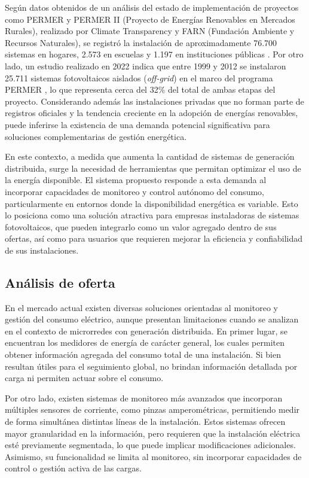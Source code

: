 Según datos obtenidos de un análisis del estado de implementación de proyectos como PERMER y PERMER II (Proyecto de Energías Renovables en Mercados Rurales), realizado por Climate Transparency y FARN (Fundación Ambiente y Recursos Naturales), se registró la instalación de aproximadamente 76.700 sistemas en hogares, 2.573 en escuelas y 1.197 en instituciones públicas \cite{farn2025_energias_renovables}. Por otro lado, un estudio realizado en 2022 indica que entre 1999 y 2012 se instalaron 25.711 sistemas fotovoltaicos aislados (\textit{off-grid}) en el marco del programa PERMER \cite{analyst2025_renewable_energy_in_argentina}, lo que representa cerca del 32\% del total de ambas etapas del proyecto. Considerando además las instalaciones privadas que no forman parte de registros oficiales y la tendencia creciente en la adopción de energías renovables, puede inferirse la existencia de una demanda potencial significativa para soluciones complementarias de gestión energética.

En este contexto, a medida que aumenta la cantidad de sistemas de generación distribuida, surge la necesidad de herramientas que permitan optimizar el uso de la energía disponible. El sistema propuesto responde a esta demanda al incorporar capacidades de monitoreo y control autónomo del consumo, particularmente en entornos donde la disponibilidad energética es variable. Esto lo posiciona como una solución atractiva para empresas instaladoras de sistemas fotovoltaicos, que pueden integrarlo como un valor agregado dentro de sus ofertas, así como para usuarios que requieren mejorar la eficiencia y confiabilidad de sus instalaciones.

\subsection{Análisis de oferta}
En el mercado actual existen diversas soluciones orientadas al monitoreo y gestión del consumo eléctrico, aunque presentan limitaciones cuando se analizan en el contexto de microrredes con generación distribuida. En primer lugar, se encuentran los medidores de energía de carácter general, los cuales permiten obtener información agregada del consumo total de una instalación. Si bien resultan útiles para el seguimiento global, no brindan información detallada por carga ni permiten actuar sobre el consumo.

Por otro lado, existen sistemas de monitoreo más avanzados que incorporan múltiples sensores de corriente, como pinzas amperométricas, permitiendo medir de forma simultánea distintas líneas de la instalación. Estos sistemas ofrecen mayor granularidad en la información, pero requieren que la instalación eléctrica esté previamente segmentada, lo que puede implicar modificaciones adicionales. Asimismo, su funcionalidad se limita al monitoreo, sin incorporar capacidades de control o gestión activa de las cargas.

